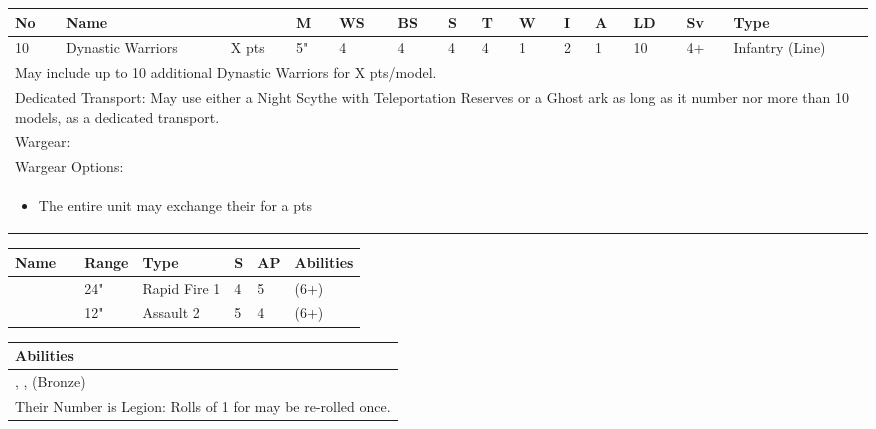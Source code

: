 

\noindent
\begin{tabular}{||m{10pt} m{95pt} m{30pt} m{11pt} m{11pt} m{11pt} m{11pt} m{11pt} m{11pt} m{11pt} m{11pt} m{11pt} m{11pt} m{125pt}||}
	\hline
	No & Name & & M & WS & BS & S & T & W & I & A & LD & Sv & Type \\
	\hline
	10 & Dynastic Warriors & X pts & 5" & 4 & 4 & 4 & 4 & 1 & 2 & 1 & 10 & 4+ & Infantry (Line)\\
	\hline
	\hline
	\multicolumn{14}{||Z{532 pt}||}{May include up to 10 additional Dynastic Warriors for X pts/model.}\\	
	\multicolumn{14}{||Z{532 pt}||}{Dedicated Transport: May use either a Night Scythe with Teleportation Reserves or a Ghost ark as long as it number nor more than 10 models, as a dedicated transport.}\\	
	\hline
	\hline
	\multicolumn{14}{||Z{532 pt}||}{Wargear: \quickref{Gauss Flayer}}\\
	\multicolumn{14}{||Z{532 pt}||}{Wargear Options:} \\	\multicolumn{14}{||Z{532 pt}||}{\begin{itemize}
			\item The entire unit may exchange their \quickref{Gauss Flayer} for a \quickref{Gauss Reaper} \hrulefill 0 pts
	\end{itemize}} \\
	\hline
\end{tabular}

\noindent
\begin{tabular}{||m{110pt} m{30pt} m{31pt} m{55pt} m{12pt} m{12pt} m{210pt}||}
	\hline
	Name & & Range & Type & S & AP & Abilities \\
	\hline
	\quickref{Gauss Flayer} & & 24" & Rapid Fire 1 & 4 & 5 & \quickref{Gauss} (6+) \\
	\quickref{Gauss Reaper} & & 12" & Assault 2 & 5 & 4 & \quickref{Gauss} (6+) \\
	\hline
\end{tabular}

\noindent
\begin{tabular}{||m{532pt}||}
	\hline
	Abilities \\
	\hline
	\quickref{Living Metal}, \quickref{Reanimation Protocols}, \quickref{Soulless Hordes} (Bronze) \\
	Their Number is Legion: Rolls of 1 for \quickref{Reanimation Protocols} may be re-rolled once. \\
	\hline
\end{tabular}


